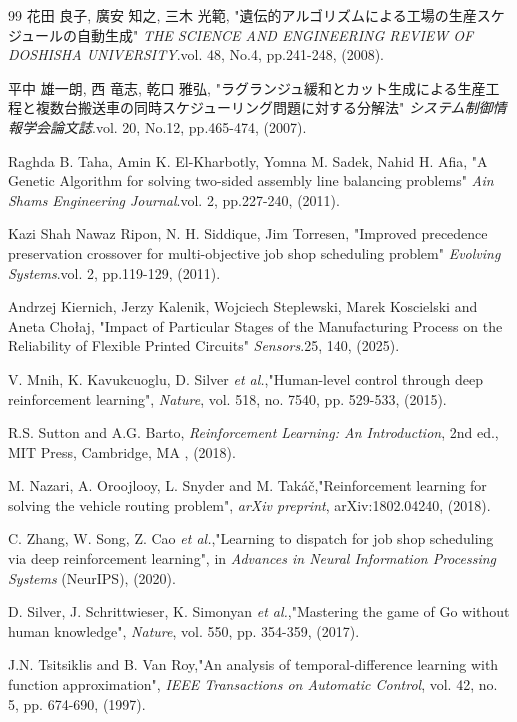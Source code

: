 \documentclass{jarticle}
\begin{document}
\begin{thebibliography}{99}
 花田 良子, 廣安 知之, 三木 光範, "遺伝的アルゴリズムによる工場の生産スケジュールの自動生成"
\textit{THE SCIENCE AND ENGINEERING REVIEW OF DOSHISHA UNIVERSITY}.vol. 48, No.4, pp.241-248, (2008).

 平中 雄一朗, 西 竜志, 乾口 雅弘, "ラグランジュ緩和とカット生成による生産工程と複数台搬送車の同時スケジューリング問題に対する分解法"
\textit{システム制御情報学会論文誌}.vol. 20, No.12, pp.465-474, (2007).

 Raghda B. Taha, Amin K. El-Kharbotly, Yomna M. Sadek, Nahid H. Afia, "A Genetic Algorithm for solving two-sided assembly line balancing problems"
\textit{Ain Shams Engineering Journal}.vol. 2, pp.227-240, (2011).

 Kazi Shah Nawaz Ripon, N. H. Siddique, Jim Torresen, "Improved precedence preservation crossover for multi-objective job shop scheduling problem"
\textit{Evolving Systems}.vol. 2, pp.119-129, (2011).

 Andrzej Kiernich, Jerzy Kalenik, Wojciech Steplewski, Marek Koscielski and Aneta Chołaj, "Impact of Particular Stages of the Manufacturing Process on the Reliability of Flexible Printed Circuits"
\textit{Sensors}.25, 140, (2025).

 V. Mnih, K. Kavukcuoglu, D. Silver \textit{et al.},"Human-level control through deep reinforcement learning",
\textit{Nature}, vol. 518, no. 7540, pp. 529-533, (2015).

 R.S. Sutton and A.G. Barto,
\textit{Reinforcement Learning: An Introduction}, 2nd ed., MIT Press, Cambridge, MA , (2018).

 M. Nazari, A. Oroojlooy, L. Snyder and M. Tak{\'a}{\v{c}},"Reinforcement learning for solving the vehicle routing problem",
\textit{arXiv preprint}, arXiv:1802.04240, (2018).

 C. Zhang, W. Song, Z. Cao \textit{et al.},"Learning to dispatch for job shop scheduling via deep reinforcement learning",
in \textit{Advances in Neural Information Processing Systems} (NeurIPS), (2020).

D. Silver, J. Schrittwieser, K. Simonyan \textit{et al.},"Mastering the game of Go without human knowledge",
\textit{Nature}, vol. 550, pp. 354-359, (2017).

 J.N. Tsitsiklis and B. Van Roy,"An analysis of temporal-difference learning with function approximation",
\textit{IEEE Transactions on Automatic Control}, vol. 42, no. 5, pp. 674-690, (1997).


\end{thebibliography}
\end{document}
